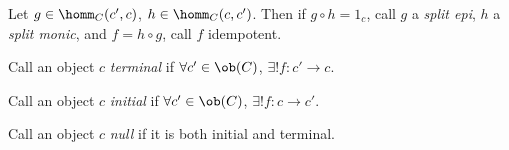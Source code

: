 \documentclass{fkbook}
\theoremstyle{snazzydefinition}
\begin{document}
Let $g \in \homm_C(c',c)$, $h \in \homm_C(c,c')$. Then if $g\circ h =
1_c$, call $g$ a \emph{split epi}, $h$ a \emph{split monic}, and $f =
h\circ g$, call $f$ idempotent.

\begin{definition}[Terminal]
  Call an object $c$ \emph{terminal} if $\forall c' \in \ob(C)$,
  $\exists ! f : c' \to c$. \\
\end{definition}

\begin{definition}[Initial]
  Call an object $c$ \emph{initial} if $\forall c' \in \ob(C)$,
  $\exists ! f : c \to c'$. \\
\end{definition}

\begin{definition}[Null]
  Call an object $c$ \emph{null} if it is both initial and terminal.
\end{definition}
\end{document}
